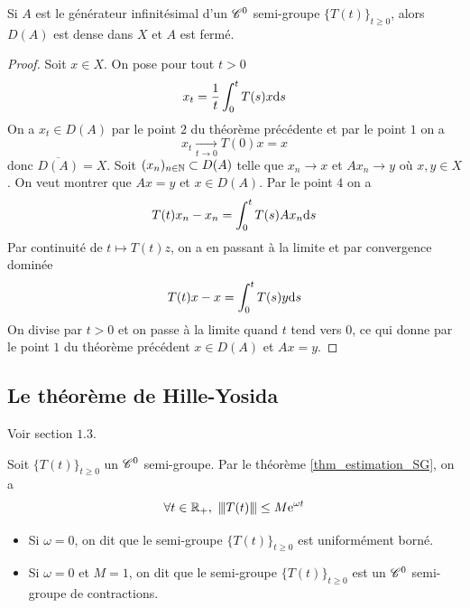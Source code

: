 \begin{corollaire}\label{cor_domaine_dense_op_ferme}
    Si $A$ est le générateur infinitésimal d'un $\mathscr{C}^0$ semi-groupe $\big\{T(t)\big\}_{t \geq 0}$, alors $D(A)$ est dense dans $X$ et $A$ est fermé.
\end{corollaire}

\begin{proof}
    Soit $x \in X$. On pose pour tout $t>0$
    \begin{equation*}
        x_t = \frac{1}{t}\int_0^tT(s)x\mathrm{d} s
    \end{equation*}
    On a $x_t \in D(A)$ par le point $2$ du théorème précédente et par le point $1$ on a
    \begin{equation*}
        x_t \underset{t \to 0}{\longrightarrow} T(0)x=x
    \end{equation*}
    donc $\overline{D(A)}=X$. Soit $(x_n)_{n \in \mathbb{N}} \subset D(A)$ telle que $x_n \longrightarrow x$ et $Ax_n \longrightarrow y$ où $x,y \in X$. On veut montrer que $Ax=y$ et $x \in D(A)$. Par le point $4$ on a 
    \begin{equation*}
        T(t)x_n-x_n=\int_0^tT(s)Ax_n\mathrm{d} s
    \end{equation*}
    Par continuité de $t \mapsto T(t)z$, on a en passant à la limite et par convergence dominée 
    \begin{equation*}
        T(t)x-x = \int_0^t T(s)y\mathrm{d} s
    \end{equation*}
    On divise par $t>0$ et on passe à la limite quand $t$ tend vers $0$, ce qui donne par le point $1$ du théorème précédent $x \in D(A)$ et $Ax=y$.
\end{proof}

\subsection{Le théorème de Hille-Yosida}
Voir \cite{Pazy1983} section $1.3$.
\begin{definition}
    Soit $\big\{T(t)\big\}_{t \geq 0}$ un $\mathscr{C}^0$ semi-groupe. Par le théorème \ref{thm_estimation_SG}, on a 
    \begin{equation*}
        \forall t \in \mathbb{R}_+, \ {\left\vert\kern-0.25ex\left\vert \kern-0.25ex\left\vert T(t) \right\vert\kern-0.25ex\right\vert\kern-0.25ex\right\vert} \leq M\mathrm{e}^{\omega t}
    \end{equation*}
    \begin{itemize}
        \item Si $\omega = 0$, on dit que le semi-groupe $\big\{T(t)\big\}_{t \geq 0}$ est \textcolor{astral}{uniformément borné}.
        \item Si $\omega = 0$ et $M=1$, on dit que le semi-groupe $\big\{T(t)\big\}_{t \geq 0}$ est un \textcolor{astral}{$\mathscr{C}^0$ semi-groupe de contractions}.
    \end{itemize}
\end{definition}

